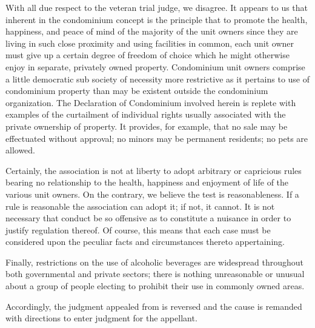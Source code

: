With all due respect to the veteran trial judge, we disagree. It appears to us
that inherent in the condominium concept is the principle that to promote the
health, happiness, and peace of mind of the majority of the unit owners since
they are living in such close proximity and using facilities in common, each
unit owner must give up a certain degree of freedom of choice which he might
otherwise enjoy in separate, privately owned property. Condominium unit owners
comprise a little democratic sub society of necessity more restrictive as it
pertains to use of condominium property than may be existent outside the
condominium organization. The Declaration of Condominium involved herein is
replete with examples of the curtailment of individual rights usually associated
with the private ownership of property. It provides, for example, that no sale
may be effectuated without approval; no minors may be permanent residents; no
pets are allowed.

Certainly, the association is not at liberty to adopt arbitrary or capricious
rules bearing no relationship to the health, happiness and enjoyment of life of
the various unit owners. On the contrary, we believe the test is reasonableness.
If a rule is reasonable the association can adopt it; if not, it cannot. It is
not necessary that conduct be so offensive as to constitute a nuisance in order
to justify regulation thereof. Of course, this means that each case must be
considered upon the peculiar facts and circumstances thereto appertaining.

Finally, restrictions on the use of alcoholic beverages are widespread
throughout both governmental and private sectors; there is nothing unreasonable
or unusual about a group of people electing to prohibit their use in commonly
owned areas.

Accordingly, the judgment appealed from is reversed and the cause is remanded
with directions to enter judgment for the appellant.

